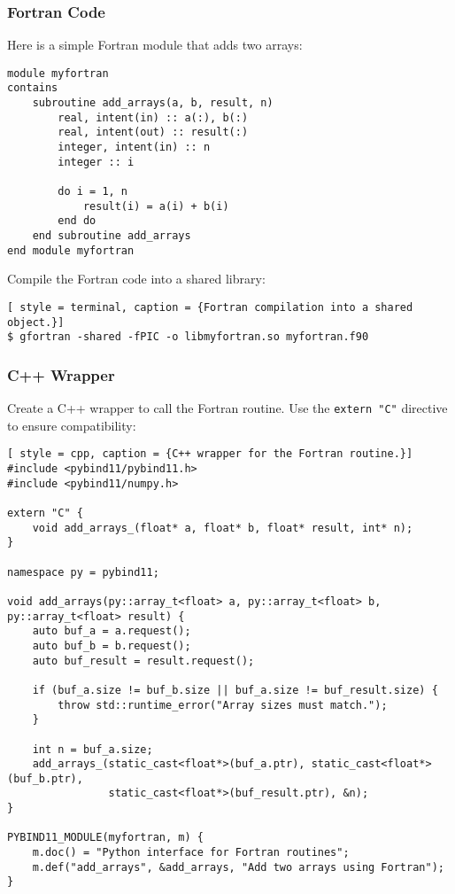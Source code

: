 \subsubsection{Fortran Code}
Here is a simple Fortran module that adds two arrays:
\begin{lstlisting}[style=fortran, caption={Fortran routine to add arrays.}]
module myfortran
contains
    subroutine add_arrays(a, b, result, n)
        real, intent(in) :: a(:), b(:)
        real, intent(out) :: result(:)
        integer, intent(in) :: n
        integer :: i

        do i = 1, n
            result(i) = a(i) + b(i)
        end do
    end subroutine add_arrays
end module myfortran
\end{lstlisting}

Compile the Fortran code into a shared library:
\begin{lstlisting}[ style = terminal, caption = {Fortran compilation into a shared object.}]
$ gfortran -shared -fPIC -o libmyfortran.so myfortran.f90
\end{lstlisting}

\subsubsection{C++ Wrapper}
Create a C++ wrapper to call the Fortran routine. Use the \texttt{extern "C"} directive to ensure compatibility:
\begin{lstlisting}[ style = cpp, caption = {C++ wrapper for the Fortran routine.}]
#include <pybind11/pybind11.h>
#include <pybind11/numpy.h>

extern "C" {
    void add_arrays_(float* a, float* b, float* result, int* n);
}

namespace py = pybind11;

void add_arrays(py::array_t<float> a, py::array_t<float> b, py::array_t<float> result) {
    auto buf_a = a.request();
    auto buf_b = b.request();
    auto buf_result = result.request();

    if (buf_a.size != buf_b.size || buf_a.size != buf_result.size) {
        throw std::runtime_error("Array sizes must match.");
    }

    int n = buf_a.size;
    add_arrays_(static_cast<float*>(buf_a.ptr), static_cast<float*>(buf_b.ptr),
                static_cast<float*>(buf_result.ptr), &n);
}

PYBIND11_MODULE(myfortran, m) {
    m.doc() = "Python interface for Fortran routines";
    m.def("add_arrays", &add_arrays, "Add two arrays using Fortran");
}
\end{lstlisting}

